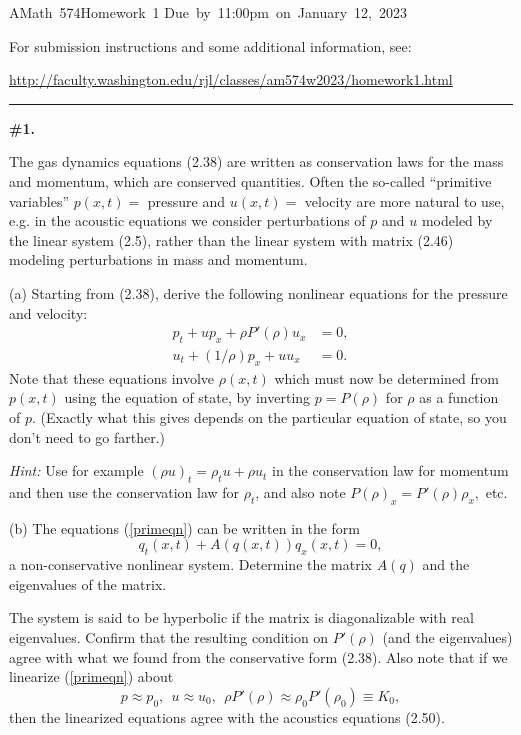 \documentclass[11pt]{article}
\begin{document}
\hfill\vbox{\hbox{AMath 574}\hbox{Homework 1}
\hbox{Due by 11:00pm on January 12, 2023}}

For submission instructions and some additional information, see:

\url{http://faculty.washington.edu/rjl/classes/am574w2023/homework1.html}


\vskip 1cm
\hrule
{\bf \#1.}

The gas dynamics equations (2.38) are written as conservation laws for the
mass and momentum, which are conserved quantities. Often the so-called
``primitive variables'' $p(x,t)=$ pressure and $u(x,t)=$ velocity are more
natural to use, e.g. in the acoustic equations we consider perturbations of
$p$ and $u$ modeled by the linear system (2.5), rather than the
linear system with matrix (2.46) modeling perturbations in mass and momentum.

(a) Starting from (2.38), derive the following nonlinear equations for the
pressure and velocity:
\begin{equation}\label{primeqn}
\begin{split}
p_t + up_x + \rho P'(\rho) u_x &= 0,\\
u_t + (1/\rho)p_x + uu_x &= 0.
\end{split} 
\end{equation} 
Note that these equations involve $\rho(x,t)$ which must now be determined
from $p(x,t)$ using the equation of state, by inverting $p = P(\rho)$ for
$\rho$ as a function of $p$.  (Exactly what this gives depends on the
particular equation of state, so you don't need to go farther.)

{\em Hint:} Use for example $(\rho u)_t = \rho_t u + \rho u_t$ in the
conservation law for momentum and then use the conservation law for
$\rho_t$, and also note $P(\rho)_x = P'(\rho)\rho_x,$ etc.

(b) The equations (\ref{primeqn}) can be written in the form 
\[
q_t(x,t) + A(q(x,t)) q_x(x,t) = 0,
\]
a non-conservative nonlinear system.  Determine the matrix $A(q)$ and
the eigenvalues of the matrix.  

The system is said to be hyperbolic if the matrix is diagonalizable
with real eigenvalues. Confirm that the resulting condition on
$P'(\rho)$ (and the eigenvalues) agree with what we found from the
conservative form (2.38).  
Also note that if we linearize (\ref{primeqn}) about
\[
p\approx p_0,~~ u\approx u_0,~~ \rho P'(\rho) \approx \rho_0
P'(\rho_0)\equiv K_0,
\]
then the linearized equations agree with the acoustics equations (2.50).
\end{document}
